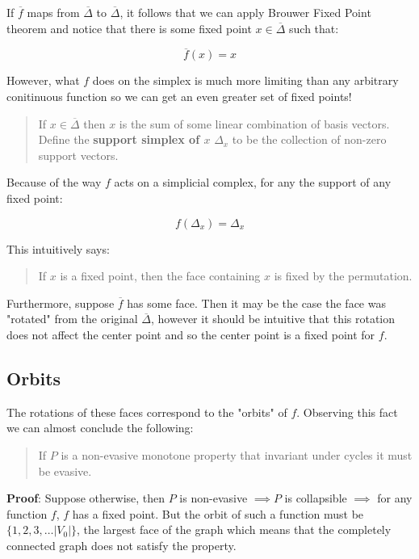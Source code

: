 \documentclass[letterpaper,12pt]{article}
\newcommand{\ol}{\overline}
\begin{document}
If $\ol{f}$ maps from $\ol{\Delta}$ to $\ol{\Delta}$, it follows that we can apply Brouwer Fixed Point theorem and notice that there is some fixed point $x \in \ol{\Delta}$ such that:

$$\ol{f}(x) = x$$

However, what $f$ does on the simplex is much more limiting than any arbitrary conitinuous function so we can get an even greater set of fixed points!

\begin{quote}
    If $x \in \ol{\Delta}$ then $x$ is the sum of some linear combination of basis vectors. Define the \textbf{support simplex of $x$} $\Delta_x$ to be the collection of non-zero support vectors.
\end{quote}

Because of the way $f$ acts on a simplicial complex, for any the support of any fixed point:

$$f(\Delta_{x}) = \Delta_x$$

This intuitively says:

\begin{quote}
    If $x$ is a fixed point, then the face containing $x$ is fixed by the permutation.
\end{quote}

Furthermore, suppose $\ol{f}$ has some face. Then it may be the case the face was "rotated" from the original $\ol{\Delta}$, however it should be intuitive that this rotation does not affect the center point and so the center point is a fixed point for $f$.

\subsection{Orbits}

The rotations of these faces correspond to the "orbits" of $f$. Observing this fact we can almost conclude the following:

\begin{quote}
    If $P$ is a non-evasive monotone property that invariant under cycles it must be evasive.
\end{quote}

\textbf{Proof}: Suppose otherwise, then $P$ is non-evasive $\implies P$ is collapsible $\implies$ for any function $f$, $f$ has a fixed point. But the orbit of such a function must be $\{1, 2, 3, \ldots |V_0| \}$, the largest face of the graph which means that the completely connected graph does not satisfy the property.
\end{document}
